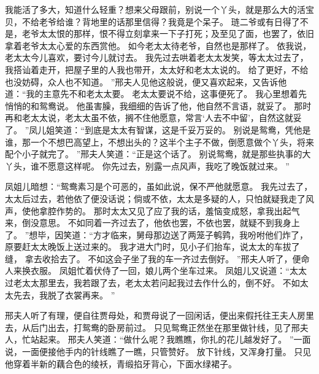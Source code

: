 我能活了多大，知道什么轻重？想来父母跟前，别说一个丫头，就是那么大的活宝贝，不给老爷给谁？背地里的话那里信得？我竟是个呆子。
琏二爷或有日得了不是，老爷太太恨的那样，恨不得立刻拿来一下子打死；及至见了面，也罢了，依旧拿着老爷太太心爱的东西赏他。
如今老太太待老爷，自然也是那样了。
依我说，老太太今儿喜欢，要讨今儿就讨去。
我先过去哄着老太太发笑，等太太过去了，我搭讪着走开，把屋子里的人我也带开，太太好和老太太说的。
给了更好，不给也没妨碍，众人也不知道。
”邢夫人见他这般说，便又喜欢起来，又告诉他道：“我的主意先不和老太太要。
老太太要说不给，这事便死了。
我心里想着先悄悄的和鸳鸯说。
他虽害臊，我细细的告诉了他，他自然不言语，就妥了。
那时再和老太太说，老太太虽不依，搁不住他愿意，常言‘人去不中留’，自然这就妥了。
”凤儿姐笑道：“到底是太太有智谋，这是千妥万妥的。
别说是鸳鸯，凭他是谁，那一个不想巴高望上，不想出头的？这半个主子不做，倒愿意做个丫头，将来配个小子就完了。
”邢夫人笑道：“正是这个话了。
别说鸳鸯，就是那些执事的大丫头，谁不愿意这样呢。
你先过去，别露一点风声，我吃了晚饭就过来。
”\par
凤姐儿暗想：“鸳鸯素习是个可恶的，虽如此说，保不严他就愿意。
我先过去了，太太后过去，若他依了便没话说；倘或不依，太太是多疑的人，只怕就疑我走了风声，使他拿腔作势的。
那时太太又见了应了我的话，羞恼变成怒，拿我出起气来，倒没意思。
不如同着一齐过去了，他依也罢，不依也罢，就疑不到我身上了。
”想毕，因笑道：“方才临来，舅母那边送了两笼子鹌鹑，我吩咐他们炸了，原要赶太太晚饭上送过来的。
我才进大门时，见小子们抬车，说太太的车拔了缝，
拿去收拾去了。
不如这会子坐了我的车一齐过去倒好。
”邢夫人听了，便命人来换衣服。
凤姐忙着伏侍了一回，娘儿两个坐车过来。
凤姐儿又说道：“太太过老太太那里去，我若跟了去，老太太若问起我过去作什么的，倒不好。
不如太太先去，我脱了衣裳再来。
”\par
邢夫人听了有理，便自往贾母处，和贾母说了一回闲话，便出来假托往王夫人房里去，从后门出去，打鸳鸯的卧房前过。
只见鸳鸯正然坐在那里做针线，见了邢夫人，忙站起来。
邢夫人笑道：“做什么呢？我瞧瞧，你扎的花儿越发好了。
”一面说，一面便接他手内的针线瞧了一瞧，只管赞好。
放下针线，又浑身打量。
只见他穿着半新的藕合色的绫袄，青缎掐牙背心，下面水绿裙子。
